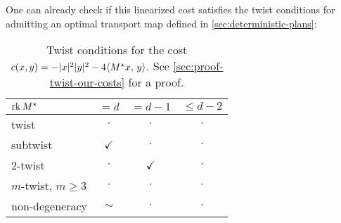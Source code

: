             One can already check if this linearized cost satisfies the twist conditions for admitting an optimal transport map defined in \cref{sec:deterministic-plans}:
            \begin{table}[h]
                \centering
                \caption{Twist conditions for the cost $c(x,y)=-|x|^2|y|^2-4\langle M^\star x,\,y\rangle$. See \cref{sec:proof-twist-our-costs} for a proof.}
                \label{tab:twist-quadratic}
                \begin{tabular}{lccc}
                $\operatorname*{rk} M^\star$ & $= d$ & $= d-1$    & $\leq d-2$ \\ \hline
                twist         & $\cdot$      & $\cdot$           & $\cdot$           \\
                subtwist      & $\checkmark$   & $\cdot$           &   $\cdot$         \\
                2-twist       & $\cdot$      & $\checkmark$        &  $\cdot$         \\
                $m$-twist, $m\geq3$ & $\cdot$      & $\cdot$        &  $\cdot$\\
                non-degeneracy & $\sim$       & $\cdot$      & $\cdot$
                \end{tabular}
            \end{table}

